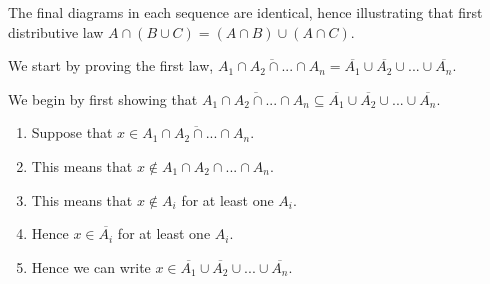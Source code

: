\documentclass[a4paper,12pt]{article}
\def \setB{ (0,0) circle (1cm) }
\def \setC{ (1.5,0) circle (1cm) }
\def \setA{ (60:1.5) circle (1cm) }
\def \setU { (-2, -1.5) rectangle (3.5, 2.75) }
\def \setX { (-2, -1.5) rectangle (5.0, 2.75) }
\begin{document}


The final diagrams in each sequence are identical, hence illustrating that first distributive law $A \cap (B \cup C)= (A \cap B) \cup (A \cap C)$.

\vspace{5mm}

We start by proving the first law, $\overline{A_1 \cap A_2 \cap ... \cap A_n} = \overline{A_1} \cup \overline{A_2} \cup ... \cup \overline{A_n}$.

\vspace{2mm}
We begin by first showing that $\overline{A_1 \cap A_2 \cap ... \cap A_n} \subseteq \overline{A_1} \cup \overline{A_2} \cup ... \cup \overline{A_n}$.

\begin{enumerate}
\item Suppose that $x \in \overline{A_1 \cap A_2 \cap ... \cap A_n}$.
\item This means that $x \notin A_1 \cap A_2 \cap ... \cap A_n$.
\item This means that $x \notin A_i$ for at least one $A_i$.
\item Hence $x \in \overline{A_i}$ for at least one $A_i$.
\item Hence we can write $x \in \overline{A_1} \cup \overline{A_2} \cup ... \cup \overline{A_n}$.
\end{enumerate}
\end{document}
